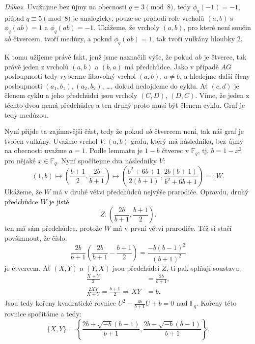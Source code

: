 \documentclass[12pt]{report}
\begin{document}
\noindent \textit{Důkaz.} Uvažujme bez újmy na obecnosti $q \equiv 3 \pmod{8}$, tedy $\phi_q(-1)= -1$, případ $q \equiv 5 \pmod{8}$ je analogicky, pouze se prohodí role vrcholů $(a,b)$ s $\phi_q(ab) =1$ a $\phi_q(ab) = -1$. Ukážeme, že vrcholy $(a,b)$, pro které není součin $ab$ čtvercem, tvoří medúzy, a pokud $\phi_q (ab) = 1$, tak tvoří vulkány hloubky $2$.

K tomu užijeme právě fakt, jenž jsme naznačili výše, že pokud $ab$ je čtverec, tak právě jeden z vrcholů $(a,b)$ a $(b,a)$ má předchůdce. Jako v případě $AG$ posloupnosti tedy vyberme libovolný vrchol $(a,b)$, $a \neq b$, a hledejme další členy posloupnosti $(a_1,b_1), (a_2,b_2)$, \dots, dokud nedojdeme do cyklu. Ať $(c,d)$ je členem cyklu a jeho předchůdci jsou vrcholy $(C,D)$, $(D,C)$. Víme, že jeden z těchto dvou nemá předchůdce a ten druhý proto musí být členem cyklu. Graf je tedy medúzou.

Nyní přijde ta zajímavější část, tedy že pokud $ab$ čtvercem není, tak náš graf je tvořen vulkány. Uvažme vrchol $V : (a,b)$ grafu, který má následníka, bez újmy na obecnosti uvažme $a=1$. Podle lemmatu je $1-b$ čtverec v $\mathbb{F}_q$, tj. $b = 1-x^2$ pro nějaké $x \in \mathbb{F}_q$. Nyní spočítejme dva následníky $V$:
$$ (1,b) \longmapsto \left(\frac{b+1}{2}, \frac{2b}{b+1} \right) \longmapsto \left( \frac{b^2+6b+1}{2(b+1)}, \frac{2b(b+1)}{b^2+6b+1} \right) =: W. $$
Ukážeme, že $W$ má v druhé větvi předchůdců nejvýše prarodiče. Opravdu, druhý předchůdce $W$ je jistě:
$$Z : \left(\frac{2b}{b+1}, \frac{b+1}{2} \right).$$
ten má sám předchůdce, protože $W$ má v první větvi prarodiče. Též si stačí povšimnout, že číslo:
$$\frac{2b}{b+1} \left( \frac{2b}{b+1} -  \frac{b+1}{2} \right) = \frac{-b (b-1)^2}{(b+1)^2}$$
je čtvercem. Ať $(X,Y)$ a $(Y,X)$ jsou předchůdci $Z$, ti pak splňují soustavu:
\begin{align*}
\frac{X+Y}{2} &= \frac{2b}{b+1},\\
\frac{2XY}{X+Y} =  \frac{b+1}{2} \Rightarrow XY &= b.
\end{align*}
Jsou tedy kořeny kvadratické rovnice $U^2 - \frac{4b}{b+1} U + b = 0$ nad $\mathbb{F}_q$.  Kořeny této rovnice spočítáme a tedy:
$$\lbrace X,Y \rbrace = \left\lbrace \frac{2b + \sqrt{-b}(b-1)}{b+1},\frac{2b - \sqrt{-b}(b-1)}{b+1} \right\rbrace.$$
\end{document}
